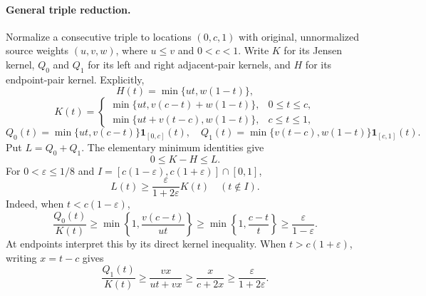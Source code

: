 \documentclass[11pt]{article}
\begin{document}
\paragraph{General triple reduction.}
Normalize a consecutive triple to locations $(0,c,1)$ with original,
unnormalized source weights $(u,v,w)$, where $u\le v$ and $0<c<1$.
Write $K$ for its Jensen kernel, $Q_0$ and $Q_1$ for its left and
right adjacent-pair kernels, and $H$ for its endpoint-pair kernel.
Explicitly,
\[
 H(t)=\min\{ut,w(1-t)\},
\]
\[
 K(t)=
 \begin{cases}
 \min\{ut,v(c-t)+w(1-t)\},&0\le t\le c,\\
 \min\{ut+v(t-c),w(1-t)\},&c\le t\le1,
 \end{cases}
\]
\[
 Q_0(t)=\min\{ut,v(c-t)\}\mathbf1_{[0,c]}(t),\quad
 Q_1(t)=\min\{v(t-c),w(1-t)\}\mathbf1_{[c,1]}(t).
\]
Put $L=Q_0+Q_1$. The elementary minimum identities give
\begin{equation}
 0\le K-H\le L.\label{audit:increment}
\end{equation}
For $0<\varepsilon\le1/8$ and
$I=[c(1-\varepsilon),c(1+\varepsilon)]\cap[0,1]$,
\begin{equation}
 L(t)\ge\frac{\varepsilon}{1+2\varepsilon}K(t)
 \quad(t\notin I).\label{audit:localize}
\end{equation}
Indeed, when $t<c(1-\varepsilon)$,
\[
 \frac{Q_0(t)}{K(t)}\ge
 \min\!\left\{1,\frac{v(c-t)}{ut}\right\}
 \ge\min\!\left\{1,\frac{c-t}{t}\right\}
 \ge\frac{\varepsilon}{1-\varepsilon}.
\]
At endpoints interpret this by its direct kernel inequality.
When $t>c(1+\varepsilon)$, writing $x=t-c$ gives
\[
 \frac{Q_1(t)}{K(t)}\ge
 \frac{vx}{ut+vx}\ge\frac{x}{c+2x}
 \ge\frac{\varepsilon}{1+2\varepsilon}.
\]
\end{document}
